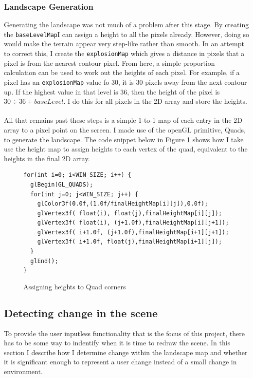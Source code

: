 \documentclass[11pt]{article}
\begin{document}
\subsubsection{Landscape Generation}
Generating the landscape was not much of a problem after this stage. By
creating the \texttt{baseLevelMap}I can assign a height to all the pixels
already. However, doing so would make the terrain appear very step-like
rather than smooth. In an attempt to correct this, I create the 
\texttt{explosionMap} which gives a distance in pixels that a pixel 
is from the nearest contour pixel. From here, a simple proportion 
calculation can be used to work out the heights of each pixel. For 
example, if a pixel has an \texttt{explosionMap} value fo 30, it is 30 
pixels away from the next contour up. If the highest value in that
level is 36, then the height of the pixel is
$30 \div 36 + baseLevel$. I do this for all pixels in the 2D array
and store the heights.\\
\\  
All that remains past these steps is a simple 1-to-1 map of each
entry in the 2D array to a pixel point on the screen. I made use of
the openGL primitive, Quads, to generate the landscape. The code snippet
below in Figure \ref{quadcode} shows how I take use the height map 
to assign heights to each vertex of the quad, equivalent to the 
heights in the final 2D array.

\begin{figure}
\begin{lstlisting}
for(int i=0; i<WIN_SIZE; i++) {
  glBegin(GL_QUADS);        
  for(int j=0; j<WIN_SIZE; j++) {
    glColor3f(0.0f,(1.0f/finalHeightMap[i][j]),0.0f);          
    glVertex3f( float(i), float(j),finalHeightMap[i][j]);
    glVertex3f( float(i), (j+1.0f),finalHeightMap[i][j+1]);
    glVertex3f( i+1.0f, (j+1.0f),finalHeightMap[i+1][j+1]);
    glVertex3f( i+1.0f, float(j),finalHeightMap[i+1][j]);
  }
  glEnd();
} 
\end{lstlisting}
\caption{Assigning heights to Quad corners}
\label{quadcode}
\end{figure}


\subsection{Detecting change in the scene}
To provide the user inputless functionality that is the focus of this
project, there has to be some way to indentify when it is time to 
redraw the scene. In this section I describe how I determine change within
the landscape map and whether it is significant enough to represent a 
user change instead of a small change in environment.
\end{document}
